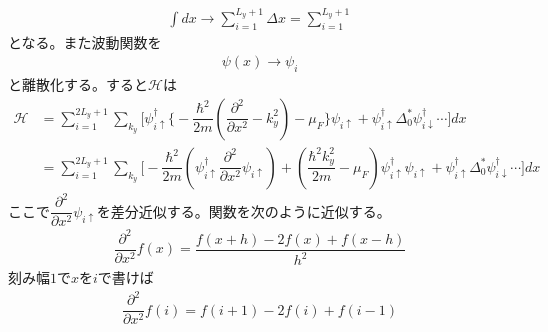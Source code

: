 \documentclass{jarticle}
\begin{document}
\begin{align}
\int dx\rightarrow\sum_{i=1}^{L_y+1}\Delta x=\sum_{i=1}^{L_y+1}
\end{align}
となる。また波動関数を
\begin{align}
\psi(x)\rightarrow\psi_i
\end{align}
と離散化する。すると$\mathcal{H}$は
\begin{align}
\mathcal{H}&=\sum_{i=1}^{2L_y+1}\displaystyle\sum_{k_y}\Big[\psi_{i\uparrow}^{\dagger}\big\{-\dfrac{\hbar^2}{2m}(\dfrac{\partial^{2}}{\partial x^2}-k^{2}_y)-\mu_F\big\}\psi_{i\uparrow}+\psi_{i\uparrow}^{\dagger}\Delta^{*}_0\psi_{i\downarrow}^{\dagger}\cdots\Big]dx\\
&=\sum_{i=1}^{2L_y+1}\displaystyle\sum_{k_y}\Big[-\dfrac{\hbar^2}{2m}(\psi_{i\uparrow}^{\dagger}\dfrac{\partial^{2}}{\partial x^2}\psi_{i\uparrow})+(\dfrac{\hbar^2k^{2}_y}{2m}-\mu_F)\psi_{i\uparrow}^{\dagger}\psi_{i\uparrow}+\psi_{i\uparrow}^{\dagger}\Delta^{*}_0\psi_{i\downarrow}^{\dagger}\cdots\Big]dx
\end{align}
ここで$\dfrac{\partial^{2}}{\partial x^2}\psi_{i\uparrow}$を差分近似する。関数を次のように近似する。
\begin{align}
\dfrac{\partial^{2}}{\partial x^2}f(x)=\dfrac{f(x+h)-2f(x)+f(x-h)}{h^2}
\end{align}
刻み幅$1$で$x$を$i$で書けば
\begin{align}
\dfrac{\partial^{2}}{\partial x^2}f(i)=f(i+1)-2f(i)+f(i-1)
\end{align}
\end{document}
